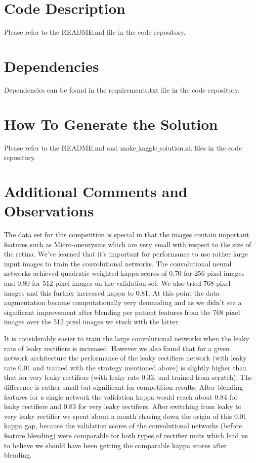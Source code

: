 \documentclass[12pt,a4paper]{scrartcl}
\begin{document}
%
\section{Code Description}
Please refer to the README.md file in the code repository.
\section{Dependencies}
Dependencies can be found in the requirements.txt file in the code repository.
\section{How To Generate the Solution}
Please refer to the README.md and make$\_$kaggle$\_$solution.sh files in the code repository.
\section{Additional Comments and Observations}
The data set for this competition is special in that the images contain important features such as Micro-aneurysms which are very small with respect to the size of the retina. We've learned that it's important for performance to use rather large input images to train the convolutional networks. The convolutional neural networks achieved quadratic weighted kappa scores of 0.70 for 256 pixel images and 0.80 for 512 pixel images on the validation set. We also tried 768 pixel images and this further increased kappa to 0.81. At this point the data augmentation became computationally very demanding and as we didn't see a significant improvement after blending per patient features from the 768 pixel images over the 512 pixel images we stuck with the latter.

It is considerably easier to train the large convolutional networks when the leaky rate of leaky rectifiers is increased. However we also found that for a given network architecture the performance of the leaky rectifiers network (with leaky rate 0.01 and trained with the strategy mentioned above) is slightly higher than that for very leaky rectifiers (with leaky rate 0.33, and trained from scratch). The difference is rather small but significant for competition results. After blending features for a single network the validation kappa would reach about 0.84 for leaky rectifiers and 0.83 for very leaky rectifiers. After switching from leaky to very leaky rectifier we spent about a month chasing down the origin of this 0.01 kappa gap, because the validation scores of the convolutional networks (before feature blending) were comparable for both types of rectifier units which lead us to believe we should have been getting the comparable kappa scores after blending.
\end{document}
